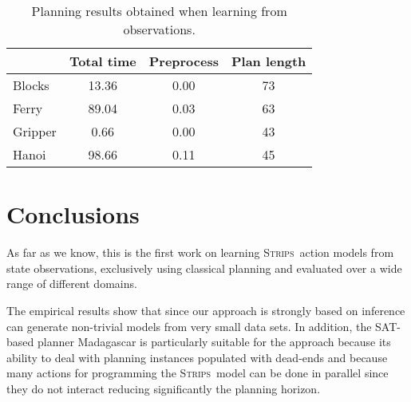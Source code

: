 \documentclass{article}
\newcommand{\strips}{\textsc{Strips}}     %
\begin{document}
\begin{table}
	\begin{footnotesize}
		\begin{center}
			\begin{tabular}{l|c|c|c|}			
				& Total time & Preprocess & Plan length  \\
				\hline
				Blocks & 13.36 & 0.00 & 73  \\
				Ferry & 89.04 & 0.03 & 63 \\
				Gripper & 0.66 & 0.00 & 43 \\
				Hanoi & 98.66 & 0.11 & 45  \\
			\end{tabular}
		\end{center}
	\end{footnotesize}
 \caption{\small Planning results obtained when learning from observations.}
\label{fig:planobservations}	
\end{table}


\section{Conclusions}
As far as we know, this is the first work on learning \strips\ action models from state observations, exclusively using classical planning and evaluated over a wide range of different domains. %

The empirical results show that since our approach is strongly based on inference can generate non-trivial models from very small data sets. In addition, the SAT-based planner {\sc Madagascar} is particularly suitable for the approach because its ability to deal with planning instances populated with dead-ends and because many actions for programming the \strips\ model can be done in parallel since they do not interact reducing significantly the planning horizon.

\end{document}
